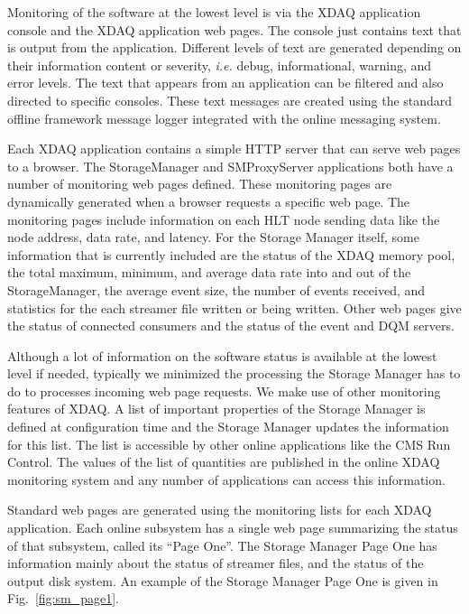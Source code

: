 Monitoring of the software at the lowest level is via the XDAQ application
console and the XDAQ application web pages. The console just contains text
that is output from the application. Different levels of text are generated
depending on their information content or severity, {\em i.e.} debug, 
informational, warning, and error levels. The text that appears from an
application can be filtered and also directed to specific consoles. These
text messages are created using the standard offline framework message logger
integrated with the online messaging system.

Each XDAQ application contains
a simple HTTP server that can serve web pages to a browser. The StorageManager
and SMProxyServer applications both have a number of monitoring web pages defined. 
These monitoring pages are dynamically generated when a browser requests
a specific web page. The monitoring pages include information on each HLT node
sending data like the node address, data rate, and latency. For the Storage
Manager itself, some information that is currently included are the status of the
XDAQ memory pool, the total maximum, minimum, and average data rate into and
out of the StorageManager, the average event size, the number of events received,
and statistics for the each streamer file written or being written. Other web pages
give the status of connected consumers and the status of the event and DQM servers.

Although a lot of information on the software status is available at the lowest 
level if needed, typically we minimized the processing the Storage Manager has 
to do to processes incoming web page requests. We make use of other monitoring
features of XDAQ. A list of important properties
of the Storage Manager is defined at configuration time and the Storage Manager
updates the information for this list. The list is accessible by other online
applications like the CMS Run Control. The values of the list of quantities are
published in the online XDAQ monitoring system and any number of applications
can access this information.

Standard web pages are generated using the monitoring lists for each XDAQ
application. Each online subsystem has a single web page summarizing the
status of that subsystem, called its ``Page One''. The Storage Manager Page One
has information mainly about the status of streamer files, and the status of
the output disk system. An example of the Storage Manager Page One is given
in Fig.~\ref{fig:sm_page1}.

